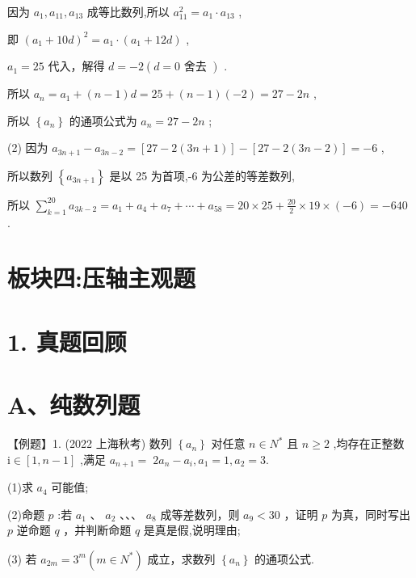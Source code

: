 \documentclass[10pt]{article}
\begin{document}
因为 \({a}_{1},{a}_{11},{a}_{13}\) 成等比数列,所以 \({a}_{11}^{2} = {a}_{1} \cdot  {a}_{13}\) ,

即 \({\left( {a}_{1} + {10}d\right) }^{2} = {a}_{1} \cdot  \left( {{a}_{1} + {12d}}\right)\) ,

\({a}_{1} = {25}\) 代入，解得 \(d =  - 2\left( {d = 0\text{ 舍去 }}\right)\) .

所以 \({a}_{n} = {a}_{1} + \left( {n - 1}\right) d = {25} + \left( {n - 1}\right) \left( {-2}\right)  = {27} - {2n}\) ,

所以 \(\left\{  {a}_{n}\right\}\) 的通项公式为 \({a}_{n} = {27} - {2n}\) ;

(2) 因为 \({a}_{{3n} + 1} - {a}_{{3n} - 2} = \left\lbrack  {{27} - 2\left( {{3n} + 1}\right) }\right\rbrack   - \left\lbrack  {{27} - 2\left( {{3n} - 2}\right) }\right\rbrack   =  - 6\) ,

所以数列 \(\left\{  {a}_{{3n} + 1}\right\}\) 是以 25 为首项,-6 为公差的等差数列,

所以 \(\mathop{\sum }\limits_{{k = 1}}^{{20}}{a}_{{3k} - 2} = {a}_{1} + {a}_{4} + {a}_{7} + \cdots  + {a}_{58} = {20} \times  {25} + \frac{20}{2} \times  {19} \times  \left( {-6}\right)  =  - {640}\) .

\section*{板块四:压轴主观题}

\section*{1. 真题回顾}

\section*{A、纯数列题}

【例题】1. (2022 上海秋考) 数列 \(\left\{  {a}_{n}\right\}\) 对任意 \(n \in  {N}^{ * }\) 且 \(n \geq  2\) ,均存在正整数 \(\mathrm{i} \in  \left\lbrack  {1,n - 1}\right\rbrack\) ,满足 \({a}_{n + 1} = \; 2{a}_{n} - {a}_{i},{a}_{1} = 1,{a}_{2} = 3.\)

(1)求 \({a}_{4}\) 可能值;

(2)命题 \(p\) :若 \({a}_{1}\) 、 \({a}_{2}\) 、、、 \({a}_{8}\) 成等差数列，则 \({a}_{9} < {30}\) ，证明 \(p\) 为真，同时写出 \(p\) 逆命题 \(q\) ，并判断命题 \(q\) 是真是假,说明理由;

(3) 若 \({a}_{2m} = {3}^{m}\left( {m \in  {N}^{ * }}\right)\) 成立，求数列 \(\left\{  {a}_{n}\right\}\) 的通项公式.
\end{document}

